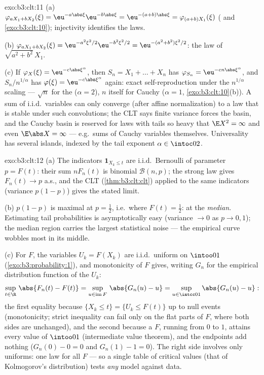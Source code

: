 \begin{solution}{exo:b3:clt:11}
(a) $\varphi_{aX_1 + bX_2}(\xi) =
\eu^{-a\abs\xi}\eu^{-b\abs\xi} = \eu^{-(a+b)\abs\xi} =
\varphi_{(a+b)X_1}(\xi)$ ( and
\cref{exo:b3:clt:10}); injectivity identifies the laws.

(b) $\varphi_{aX_1+bX_2}(\xi) = \eu^{-a^2\xi^2/2}
\eu^{-b^2\xi^2/2} = \eu^{-(a^2+b^2)\xi^2/2}$: the law of
$\sqrt{a^2+b^2}\,X_1$.

(c) If $\varphi_X(\xi) = \eu^{-c\abs\xi^\alpha}$, then
$S_n = X_1 + \dots + X_n$ has $\varphi_{S_n} =
\eu^{-cn\abs\xi^\alpha}$, and $S_n/n^{1/\alpha}$ has
$\varphi(\xi) = \eu^{-c\abs\xi^\alpha}$ again: exact
self-reproduction under the $n^{1/\alpha}$ scaling ---
$\sqrt n$ for the  ($\alpha = 2$), $n$ itself for
Cauchy ($\alpha = 1$, \cref{exo:b3:clt:10}(b)). A sum of
i.i.d.\ variables can only converge (after affine
normalization) to a law that is stable under such
convolutions; the CLT says finite variance forces the
 basin, and the Cauchy basin is reserved for laws
with tails so heavy that $\E X^2 = \infty$ and even $\E\abs
X = \infty$ --- e.g.\ sums of Cauchy variables themselves.
Universality has several islands, indexed by the tail
exponent $\alpha \in \intoc02$.
\end{solution}

\begin{solution}{exo:b3:clt:12}
(a) The indicators $\mathbf 1_{X_k \leq t}$ are i.i.d.\
Bernoulli of parameter $p = F(t)$: their sum $nF_n(t)$ is
binomial $\mathcal B(n, p)$; the strong law gives $F_n(t)
\to p$ a.s., and the CLT (\cref{thm:b3:clt:clt}) applied to
the same indicators (variance $p(1-p)$) gives the stated
 limit.

(b) $p(1 - p)$ is maximal at $p = \frac12$, i.e.\ where
$F(t) = \frac12$: at the \emph{median}. Estimating tail
probabilities is asymptotically easy (variance $\to 0$ as
$p \to 0, 1$); the median region carries the largest
statistical noise --- the empirical curve wobbles most in
its middle.

(c) For  $F$, the variables $U_k = F(X_k)$ are
i.i.d.\ uniform on $\intoo01$ (\cref{exo:b3:probability:1}),
and monotonicity of $F$ gives, writing $G_n$ for the
empirical distribution function of the $U_k$:
\[
\sup_{t\in\R}\,\abs{F_n(t) - F(t)}
= \sup_{u \in \operatorname{im}F}\,\abs{G_n(u) - u}
= \sup_{u\in\intcc01}\abs{G_n(u) - u} :
\]
the first equality because $\{X_k \leq t\} = \{U_k \leq
F(t)\}$ up to null events (monotonicity; strict inequality
can fail only on the flat parts of $F$, where both sides
are unchanged), and the second because a  $F$,
running from $0$ to $1$, attains every value of
$\intoo01$ (intermediate value theorem), and the endpoints
add nothing ($G_n(0) - 0 = 0$ and $G_n(1) - 1 = 0$). The
right side involves only uniforms: one law
for all $F$ --- so a single table of critical values (that
of Kolmogorov's distribution) tests \emph{any} 
model against data.
\end{solution}

